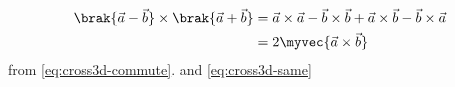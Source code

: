   \begin{align}
	  \brak{\vec{a}-\vec{b}}\times\brak{\vec{a}+\vec{b}}
	  &=
\vec{a}\times\vec{a}
-\vec{b}\times\vec{b}
	  +\vec{a}\times\vec{b}
-\vec{b}\times\vec{a}
\nonumber \\
	  &=
  2\myvec{\vec{a}\times\vec{b}}
  \end{align}
  from 
  \eqref{eq:cross3d-commute}.
  and
  \eqref{eq:cross3d-same}

